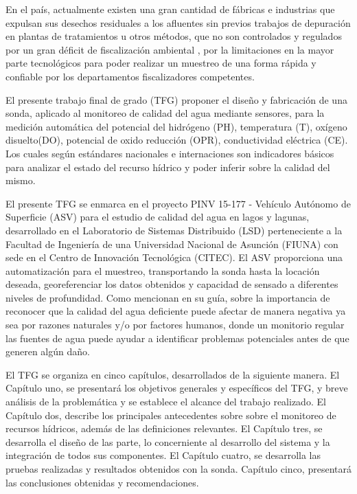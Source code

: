 En el país, actualmente existen una gran cantidad de fábricas e industrias que expulsan sus desechos residuales a los afluentes sin previos trabajos de depuración en plantas de tratamientos u otros métodos, que no son controlados y regulados por un gran déficit de fiscalización ambiental , por la limitaciones en la mayor parte tecnol\'ogicos para poder realizar un muestreo de una forma r\'apida y confiable por los departamentos fiscalizadores competentes. 

%
%

El presente trabajo final de grado (TFG) proponer el diseño y fabricación de una sonda, aplicado al monitoreo de calidad del agua mediante sensores, para la medición automática del potencial del hidrógeno (PH), temperatura (T), oxígeno disuelto(DO), potencial de oxido reducción (OPR), conductividad eléctrica (CE). 
Los cuales según estándares nacionales e internaciones son indicadores básicos para analizar el estado del recurso hídrico y poder inferir sobre la calidad del mismo.  


El presente TFG se enmarca en el proyecto PINV 15-177 - Vehículo Autónomo de Superficie (ASV) para el estudio de calidad del agua en lagos y lagunas, desarrollado en el Laboratorio de Sistemas Distribuido (LSD) perteneciente a la Facultad de Ingeniería de una Universidad Nacional de Asunción (FIUNA) con sede en el Centro de Innovación Tecnológica (CITEC). 
El ASV proporciona una automatización para el muestreo, transportando la sonda hasta la locación deseada, georeferenciar los datos obtenidos y capacidad de sensado a diferentes niveles de profundidad. 
Como mencionan \cite{guiaHANNA}en su gu\'ia, sobre la importancia de reconocer que la calidad del agua deficiente puede afectar de manera negativa  ya sea por razones naturales y/o por factores humanos, donde un monitorio regular las fuentes de agua puede ayudar a identificar problemas potenciales antes de que generen algún daño.


El TFG  se organiza en cinco capítulos, desarrollados de la siguiente manera. 
El Capítulo uno, se presentará los objetivos generales y específicos del TFG,  y breve an\'alisis de la problemática y se establece el alcance del trabajo realizado.
El Capítulo dos, describe los principales antecedentes sobre sobre el monitoreo de recursos hídricos, además de las definiciones relevantes.
El Capítulo tres, se desarrolla el diseño de las parte, lo concerniente al desarrollo del sistema y la integración de todos sus componentes.   
El Capítulo cuatro, se desarrolla las pruebas realizadas y resultados obtenidos con la sonda. 
Capítulo cinco,  presentará las conclusiones obtenidas y recomendaciones.


